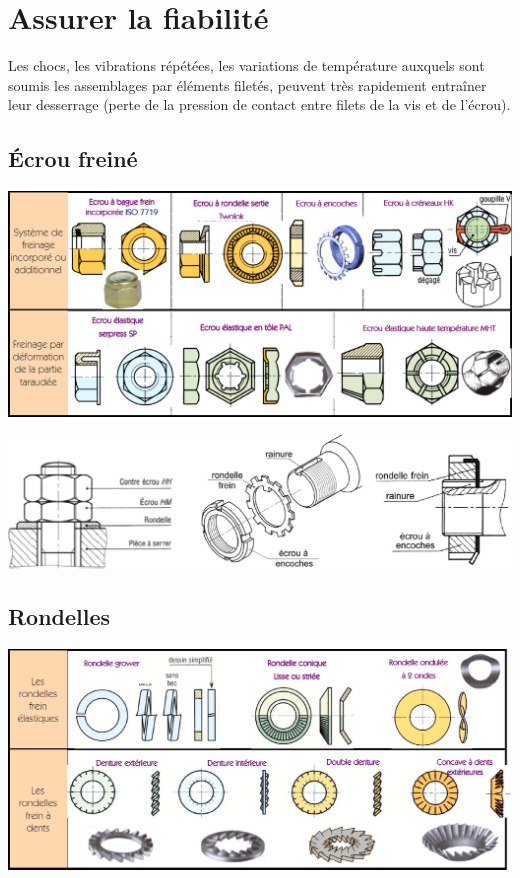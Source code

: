 \documentclass[11pt,oneside]{article}
\begin{document}
\section{Assurer la fiabilité}
Les chocs, les vibrations répétées, les variations de température auxquels sont soumis les assemblages par
éléments filetés, peuvent très rapidement entraîner leur desserrage (perte de la pression de contact entre
filets de la vis et de l'écrou).


\subsection{Écrou freiné}
\begin{center}
\includegraphics[width=.8\textwidth]{png/ecrous_2}
\end{center}

\begin{center}
\includegraphics[width=.8\textwidth]{png/ecrous_3}
\end{center}

\subsection{Rondelles}

\begin{center}
\includegraphics[width=.8\textwidth]{png/rondelles}
\end{center}
\end{document}
